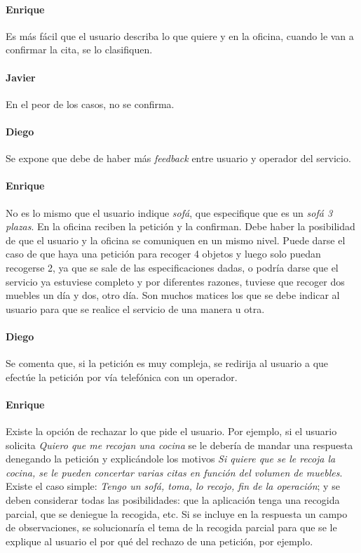 \paragraph{Enrique} Es más fácil que el usuario describa lo que quiere y en la oficina, cuando le van a confirmar la cita, se lo clasifiquen.
 
\paragraph{Javier} En el peor de los casos, no se confirma.
 
\paragraph{Diego} Se expone que debe de haber más \textit{feedback} entre usuario y operador del servicio.
 
\paragraph{Enrique} No es lo mismo que el usuario indique \textit{sofá}, que especifique que es un  \textit{sofá 3 plazas}. En la oficina reciben la petición y la confirman. Debe haber la posibilidad de que el usuario y la oficina se comuniquen en un mismo nivel. Puede darse el caso de que haya una petición para recoger 4 objetos y luego solo puedan recogerse 2, ya que se sale de las especificaciones dadas, o podría darse que el servicio ya estuviese completo y por diferentes razones, tuviese que recoger dos muebles un día y dos, otro día. Son muchos matices los que se debe  indicar al usuario para que se realice el servicio de una manera u otra.
 
\paragraph{Diego} Se comenta que, si la petición es muy compleja, se redirija al usuario a que efectúe la petición por vía telefónica con un operador.
 
\paragraph{Enrique} Existe la opción de rechazar lo que pide el usuario. Por ejemplo, si el usuario solicita \textit{Quiero que me recojan una cocina} se le debería de mandar una respuesta denegando la petición y explicándole los motivos \textit{Si quiere que se le recoja la cocina, se le pueden concertar varias citas en función del volumen de muebles}. Existe el caso simple: \textit{Tengo un sofá, toma, lo recojo, fin de la operación}; y se deben considerar todas las posibilidades: que la aplicación tenga una recogida parcial, que se deniegue la recogida, etc. Si se incluye en la respuesta un campo de observaciones, se solucionaría el tema de la recogida parcial para que se le explique al usuario el por qué del rechazo de una petición, por ejemplo.

